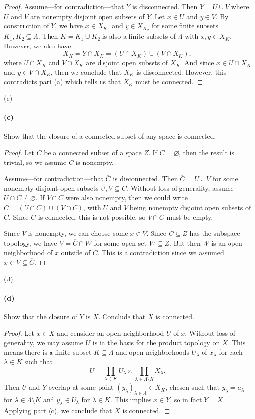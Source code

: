 \documentclass[12pt]{article}
\newlength{\myparskip}
\newenvironment{fullbox}{\begin{lrbox}{\savefullbox}\begin{minipage}{\dimexpr\textwidth-2\fboxsep\relax}\setlength{\parskip}{\myparskip}}{\end{minipage}\end{lrbox}\framebox[\textwidth]{\usebox{\savefullbox}}}
\newenvironment{pbox}[1][]{\begin{fullbox}\ifx#1\empty\else\paragraph{#1}\fi}{\end{fullbox}}
\renewcommand{\emptyset}{\varnothing}
\newcommand{\<}{\langle}
\renewcommand{\>}{\rangle}
\newcommand{\clo}{\overline}
\theoremstyle{definition}
\begin{document}
\begin{proof}
    Assume---for contradiction---that $Y$ is disconnected.
    Then $Y = U \cup V$ where $U$ and $V$ are nonempty disjoint open subsets of $Y$. Let $x \in U$ and $y \in V$.
    By construction of $Y$, we have $x \in X_{K_1}$ and $y \in X_{K_2}$ for some finite subsets $K_1, K_2 \subseteq \Lambda$. 
    Then $K = K_1 \cup K_2$ is also a finite subsets of $\Lambda$ with $x, y \in X_K$.
    However, we also have
    \[
        X_K = Y \cap X_K = (U \cap X_K) \cup (V \cap X_K),
    \]
    where $U \cap X_K$ and $V \cap X_K$ are disjoint open subsets of $X_K$.
    And since $x \in U \cap X_K$ and $y \in V \cap X_K$, then we conclude that $X_K$ is disconnected.
    However, this contradicts part (a) which tells us that $X_K$ must be connected.
\end{proof}

\begin{pbox}[(c)]
    Show that the closure of a connected subset of any space is connected.
\end{pbox}

\begin{proof}
    Let $C$ be a connected subset of a space $Z$. If $C = \emptyset$, then the result is trivial, so we assume $C$ is nonempty.

    Assume---for contradiction---that $\clo{C}$ is disconnected.
    Then $\clo{C} = U \cup V$ for some nonempty disjoint open subsets $U, V \subseteq \clo{C}$.
    Without loss of generality, assume $U \cap C \ne \emptyset$.
    If $V \cap C$ were also nonempty, then we could write $C = (U \cap C) \cup (V \cap C)$, with $U$ and $V$ being nonempty disjoint open subsets of $C$.
    Since $C$ is connected, this is not possible, so $V \cap C$ must be empty.
    
    Since $V$ is nonempty, we can choose some $x \in V$. Since $\clo{C} \subseteq Z$ has the subspace topology, we have $V = \clo{C} \cap W$ for some open set $W \subseteq Z$. But then $W$ is an open neighborhood of $x$ outside of $C$. This is a contradiction since we assumed $x \in V \subseteq \clo{C}$.
\end{proof}

\begin{pbox}[(d)]
    Show that the closure of $Y$ is $X$.  Conclude that $X$ is connected.
\end{pbox}

\begin{proof}
    Let $x \in X$ and consider an open neighborhood $U$ of $x$.
    Without loss of generality, we may assume $U$ is in the basis for the product topology on $X$.
    This means there is a finite subset $K \subseteq \Lambda$ and open neighborhoods $U_\lambda$ of $x_\lambda$ for each $\lambda \in K$ such that
    \[
        U = \prod_{\lambda \in K} U_\lambda \times \prod_{\lambda \in \Lambda \setminus K} X_\lambda.
    \]
    Then $U$ and $Y$ overlap at some point $(y_\lambda)_{\lambda \in \Lambda} \in X_K$, chosen such that $y_\lambda = a_\lambda$ for $\lambda \in \Lambda \setminus K$ and $y_\lambda \in U_\lambda$ for $\lambda \in K$.
    This implies $x \in \clo{Y}$, so in fact $\clo{Y} = X$.
    Applying part (c), we conclude that $X$ is connected.
\end{proof}
\end{document}
